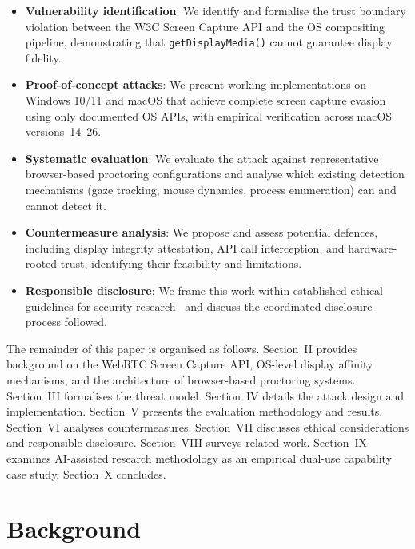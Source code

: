 \documentclass[conference]{IEEEtran}
\begin{document}
\begin{itemize}
\item \textbf{Vulnerability identification}: We identify and formalise the trust boundary violation between the W3C Screen Capture API and the OS compositing pipeline, demonstrating that \texttt{getDisplayMedia()} cannot guarantee display fidelity.

\item \textbf{Proof-of-concept attacks}: We present working implementations on Windows 10/11 and macOS that achieve complete screen capture evasion using only documented OS APIs, with empirical verification across macOS versions~14--26.

\item \textbf{Systematic evaluation}: We evaluate the attack against representative browser-based proctoring configurations and analyse which existing detection mechanisms (gaze tracking, mouse dynamics, process enumeration) can and cannot detect it.

\item \textbf{Countermeasure analysis}: We propose and assess potential defences, including display integrity attestation, API call interception, and hardware-rooted trust, identifying their feasibility and limitations.

\item \textbf{Responsible disclosure}: We frame this work within established ethical guidelines for security research~\cite{acm2018code,ieee2024code,owasp2025disclosure,first2020guidelines,cisa2025coordinated} and discuss the coordinated disclosure process followed.
\end{itemize}

The remainder of this paper is organised as follows. Section~II provides background on the WebRTC Screen Capture API, OS-level display affinity mechanisms, and the architecture of browser-based proctoring systems. Section~III formalises the threat model. Section~IV details the attack design and implementation. Section~V presents the evaluation methodology and results. Section~VI analyses countermeasures. Section~VII discusses ethical considerations and responsible disclosure. Section~VIII surveys related work. Section~IX examines AI-assisted research methodology as an empirical dual-use capability case study. Section~X concludes.

\section{Background}
\end{document}

